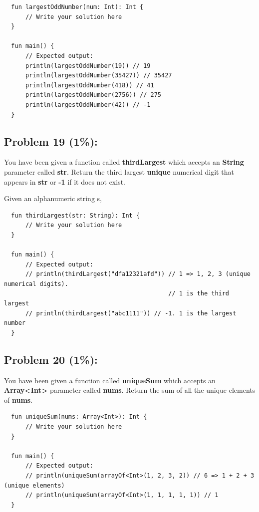 \documentclass{article}
\begin{document}
\begin{verbatim}
  fun largestOddNumber(num: Int): Int {
      // Write your solution here   
  }

  fun main() {
      // Expected output:
      println(largestOddNumber(19)) // 19
      println(largestOddNumber(35427)) // 35427
      println(largestOddNumber(418)) // 41
      println(largestOddNumber(2756)) // 275
      println(largestOddNumber(42)) // -1
  }
\end{verbatim}

\subsection*{Problem 19 (1\%):}
You have been given a function called \textbf{thirdLargest} which accepts an \textbf{String} parameter called \textbf{str}. Return the third largest \textbf{unique} numerical digit that appears in \textbf{str} or \textbf{-1} if it does not exist.

Given an alphanumeric string s, 
\begin{verbatim}
  fun thirdLargest(str: String): Int {
      // Write your solution here
  }

  fun main() {
      // Expected output:
      // println(thirdLargest("dfa12321afd")) // 1 => 1, 2, 3 (unique numerical digits). 
                                              // 1 is the third largest
      // println(thirdLargest("abc1111")) // -1. 1 is the largest number
  }
\end{verbatim}

\subsection*{Problem 20 (1\%):}
You have been given a function called \textbf{uniqueSum} which accepts an \textbf{Array<Int>} parameter called \textbf{nums}. Return the sum of all the unique elements of \textbf{nums}.

\begin{verbatim}
  fun uniqueSum(nums: Array<Int>): Int {
      // Write your solution here 
  }

  fun main() {
      // Expected output:
      // println(uniqueSum(arrayOf<Int>(1, 2, 3, 2)) // 6 => 1 + 2 + 3 (unique elements)
      // println(uniqueSum(arrayOf<Int>(1, 1, 1, 1, 1)) // 1
  }
\end{verbatim}
\end{document}
